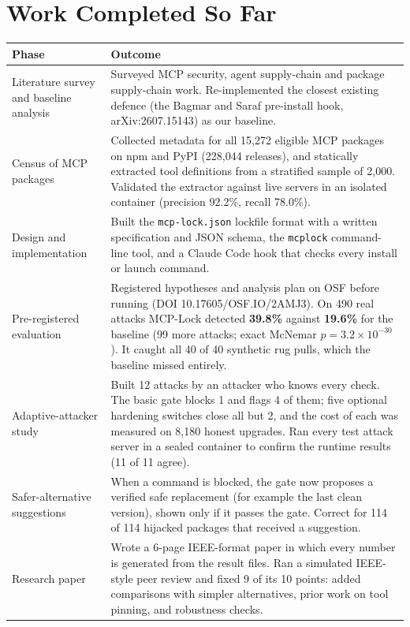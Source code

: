 \documentclass[11pt,a4paper]{article}
\begin{document}
\section{Work Completed So Far}
\begin{tabularx}{\textwidth}{@{}>{\raggedright\arraybackslash}p{3.1cm}X@{}}
\toprule
\textbf{Phase} & \textbf{Outcome} \\
\midrule
Literature survey and baseline analysis &
Surveyed MCP security, agent supply-chain and package supply-chain work. Re-implemented the closest existing
defence (the Bagmar and Saraf pre-install hook, arXiv:2607.15143) as our baseline. \\
Census of MCP packages &
Collected metadata for all 15,272 eligible MCP packages on npm and PyPI (228,044 releases), and statically
extracted tool definitions from a stratified sample of 2,000. Validated the extractor against live servers in an
isolated container (precision 92.2\%, recall 78.0\%). \\
Design and implementation &
Built the \texttt{mcp-lock.json} lockfile format with a written specification and JSON schema, the
\texttt{mcplock} command-line tool, and a Claude Code hook that checks every install or launch command. \\
Pre-registered evaluation &
Registered hypotheses and analysis plan on OSF before running (DOI 10.17605/OSF.IO/2AMJ3). On 490 real attacks
MCP-Lock detected \textbf{39.8\%} against \textbf{19.6\%} for the baseline (99 more attacks; exact McNemar
$p = 3.2\times10^{-30}$). It caught all 40 of 40 synthetic rug pulls, which the baseline missed entirely. \\
Adaptive-attacker study &
Built 12 attacks by an attacker who knows every check. The basic gate blocks 1 and flags 4 of them; five
optional hardening switches close all but 2, and the cost of each was measured on 8,180 honest upgrades. Ran every
test attack server in a sealed container to confirm the runtime results (11 of 11 agree). \\
Safer-alternative suggestions &
When a command is blocked, the gate now proposes a verified safe replacement (for example the last clean
version), shown only if it passes the gate. Correct for 114 of 114 hijacked packages that received a suggestion. \\
Research paper &
Wrote a 6-page IEEE-format paper in which every number is generated from the result files. Ran a simulated IEEE-style
peer review and fixed 9 of its 10 points: added comparisons with simpler alternatives, prior work on tool pinning,
and robustness checks. \\
\bottomrule
\end{tabularx}
\end{document}
